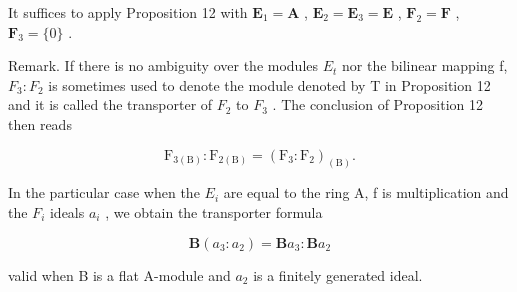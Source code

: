 It suffices to apply Proposition 12 with \(\mathbf{E}_1 = \mathbf{A}\) , \(\mathbf{E}_2 = \mathbf{E}_3 = \mathbf{E}\) , \(\mathbf{F}_2 = \mathbf{F}\) , \(\mathbf{F}_3 = \{0\}\) .

Remark. If there is no ambiguity over the modules \(E_{t}\) nor the bilinear mapping f, \(F_{3}: F_{2}\) is sometimes used to denote the module denoted by T in Proposition 12 and it is called the transporter of \(F_{2}\) to \(F_{3}\) . The conclusion of Proposition 12 then reads

\[
\mathrm{F} _ {3 (\mathrm{B})}: \mathrm{F} _ {2 (\mathrm{B})} = \left(\mathrm{F} _ {3}: \mathrm{F} _ {2}\right) _ {(\mathrm{B})}.\tag{11}
\]

In the particular case when the \(E_{i}\) are equal to the ring A, f is multiplication and the \(F_{i}\) ideals \(a_{i}\) , we obtain the transporter formula

\[
\mathbf {B} \left(a _ {3}: a _ {2}\right) = \mathbf {B} a _ {3}: \mathbf {B} a _ {2}\tag{12}
\]

valid when B is a flat A-module and \(a_{2}\) is a finitely generated ideal.
\relax{}
